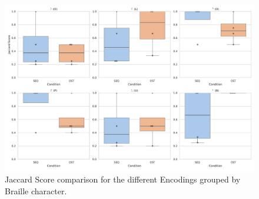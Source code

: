 \begin{figure}
    \centering
    \includegraphics[width=\linewidth]{src/pictures/Study2Data_Experiment/character_jaccard_test_study2.pdf}
    \caption{Jaccard Score comparison for the different Encodings grouped by Braille character.}
    \label{fig:f1score_test_study2}
\end{figure}


\begin{table}[ht]
\caption{Results of the \gls{mwu} for significance grouped by the different Braille characters during learning for the different Encodings with Cohen's d.}
\label{table:learning_significance_results_secondStudy_nonPar}
\end{table}

